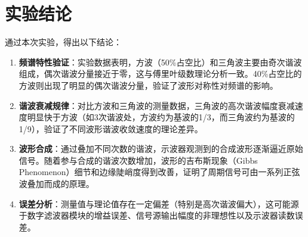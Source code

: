 \documentclass[12pt, a4paper]{ctexrep}
\begin{document}
\section{实验结论}
通过本次实验，得出以下结论：
\begin{enumerate}
    \item \textbf{频谱特性验证}：实验数据表明，方波（50\%占空比）和三角波主要由奇次谐波组成，偶次谐波分量接近于零，这与傅里叶级数理论分析一致。40\%占空比的方波则出现了明显的偶次谐波分量，验证了波形对称性对频谱的影响。
    \item \textbf{谐波衰减规律}：对比方波和三角波的测量数据，三角波的高次谐波幅度衰减速度明显快于方波（如3次谐波处，方波约为基波的1/3，而三角波约为基波的1/9），验证了不同波形谐波收敛速度的理论差异。
    \item \textbf{波形合成}：通过叠加不同次数的谐波，示波器观测到的合成波形逐渐逼近原始信号。随着参与合成的谐波次数增加，波形的吉布斯现象（Gibbs Phenomenon）细节和边缘陡峭度得到改善，证明了周期信号可由一系列正弦波叠加而成的原理。
    \item \textbf{误差分析}：测量值与理论值存在一定偏差（特别是高次谐波偏大），这可能源于数字滤波器模块的增益误差、信号源输出幅度的非理想性以及示波器读数误差。
\end{enumerate}
\end{document}
